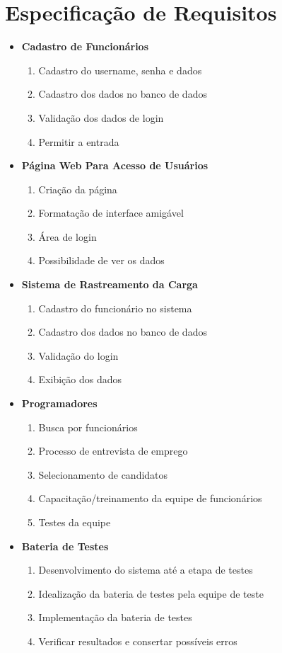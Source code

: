 \section{Especificação de Requisitos}
\begin{itemize}
	\item \textbf{Cadastro de Funcionários} \begin{enumerate}
		\item Cadastro do username, senha e dados
		\item Cadastro dos dados no banco de dados
		\item Validação dos dados de login
		\item Permitir a entrada
	\end{enumerate}

	\item \textbf{Página Web Para Acesso de Usuários} \begin{enumerate}
		\item Criação da página
		\item Formatação de interface amigável
		\item Área de login
		\item Possibilidade de ver os dados
	\end{enumerate}

	\item \textbf{Sistema de Rastreamento da Carga} \begin{enumerate}
		\item Cadastro do funcionário no sistema
		\item Cadastro dos dados no banco de dados
		\item Validação do login
		\item Exibição dos dados 
	\end{enumerate}

	\item \textbf{Programadores} \begin{enumerate}
		\item Busca por funcionários
		\item Processo de entrevista de emprego
		\item Selecionamento de candidatos
		\item Capacitação/treinamento da equipe de funcionários
		\item Testes da equipe
	\end{enumerate}

	\item \textbf{Bateria de Testes} \begin{enumerate}
		\item Desenvolvimento do sistema até a etapa de testes
		\item Idealização da bateria de testes pela equipe de teste
		\item Implementação da bateria de testes
		\item Verificar resultados e consertar possíveis erros
	\end{enumerate}


\end{itemize}

